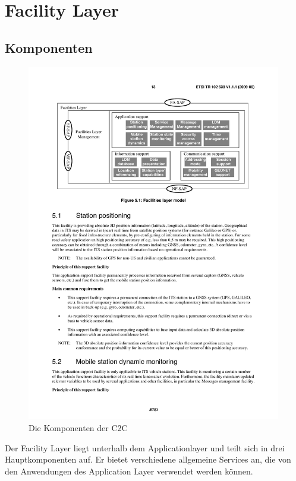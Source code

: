 \chapter{Facility Layer \label{chap:facilitylayer}}
\section{Komponenten}
\begin{figure}[htbp]
\includegraphics[width=0.99\textwidth]{content/images/04_facilitylayer/facility_layer_model.pdf}
\caption{Die Komponenten der \acl{C2C} \cite{etsi102638}}
\label{fig:komponentenfacility}
\end{figure}
Der Facility Layer liegt unterhalb dem Applicationlayer und teilt sich in drei Hauptkomponenten auf. Er bietet verschiedene allgemeine Services an, die von den Anwendungen des Application Layer verwendet werden können.

